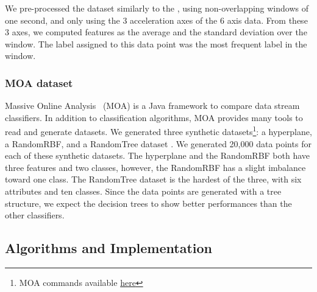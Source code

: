 We pre-processed the dataset similarly to the
\banosdataset, using non-overlapping windows of
one second, and only using the 3 acceleration axes
of the 6 axis data. From these 3 axes, we computed
features as the average and the standard deviation
over the window. The label assigned to this data
point was the most frequent label in the window.

\subsubsection{MOA dataset}
Massive Online Analysis~\cite{moa} (MOA) is a Java framework to compare
data stream classifiers. In addition to classification algorithms, MOA provides many
tools to read and generate datasets.
We generated three synthetic datasets\footnote{MOA commands available \href{https://github.com/azazel7/paper-benchmark/blob/e0c9a94d0d17490f7ab14293dec20b8322a6447c/Makefile\#L90}{here}}:
a hyperplane, a RandomRBF, and a RandomTree
dataset . We generated 20,000 data points
 for each of these synthetic datasets.
The hyperplane and the RandomRBF both have three features and two classes, however, the RandomRBF has a slight imbalance toward one class.
The RandomTree dataset is the hardest of the three, with six attributes and
ten classes. Since the data points are generated with a tree structure, we
expect the decision trees to show better performances than the other
classifiers.

\subsection{Algorithms and Implementation}




